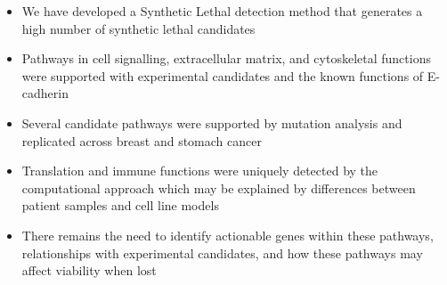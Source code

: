     
  \begin{itemize}
   \item We have developed a Synthetic Lethal detection method that generates a high number of synthetic lethal candidates
   
   \bigskip
   
   \item Pathways in cell signalling, extracellular matrix, and cytoskeletal functions were supported with experimental candidates and the known functions of E-cadherin
   
   \bigskip
   
   \item Several candidate pathways were supported by mutation analysis and replicated across breast and stomach cancer
   
   \bigskip
   
   \item Translation and immune functions were uniquely detected by the computational approach which may be explained by differences between patient samples and cell line models
   
   \bigskip
   
   \item There remains the need to identify actionable genes within these pathways, relationships with experimental candidates, and how these pathways may affect viability when lost
  \end{itemize}